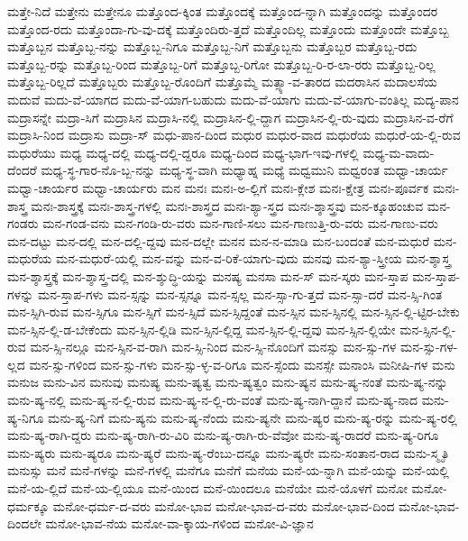 {ಮತ್ತೇ-ನಿದೆ
ಮತ್ತೇನು
ಮತ್ತೇನೂ
ಮತ್ತೊಂದ-ಕ್ಕಿಂತ
ಮತ್ತೊಂದಕ್ಕೆ
ಮತ್ತೊಂದ-ನ್ನಾಗಿ
ಮತ್ತೊಂದನ್ನು
ಮತ್ತೊಂದರ
ಮತ್ತೊಂದ-ರದು
ಮತ್ತೊಂದಾ-ಗು-ವು-ದಕ್ಕೆ
ಮತ್ತೊಂದಿರು-ತ್ತದೆ
ಮತ್ತೊಂದಿಲ್ಲ
ಮತ್ತೊಂದು
ಮತ್ತೊಂದೇ
ಮತ್ತೊಬ್ಬ
ಮತ್ತೊಬ್ಬನ
ಮತ್ತೊಬ್ಬ-ನನ್ನು
ಮತ್ತೊಬ್ಬ-ನಿಗೂ
ಮತ್ತೊಬ್ಬ-ನಿಗೆ
ಮತ್ತೊಬ್ಬನು
ಮತ್ತೊಬ್ಬರ
ಮತ್ತೊಬ್ಬ-ರದು
ಮತ್ತೊಬ್ಬ-ರನ್ನು
ಮತ್ತೊಬ್ಬ-ರಿಂದ
ಮತ್ತೊಬ್ಬ-ರಿಗೆ
ಮತ್ತೊಬ್ಬ-ರಿಗೋ
ಮತ್ತೊಬ್ಬ-ರಿ-ರ-ಲಾ-ರರು
ಮತ್ತೊಬ್ಬ-ರಿಲ್ಲ
ಮತ್ತೊಬ್ಬ-ರಿಲ್ಲದೆ
ಮತ್ತೊಬ್ಬರು
ಮತ್ತೊಬ್ಬ-ರೊಂದಿಗೆ
ಮತ್ತೊಮ್ಮೆ
ಮತ್ಸ್ಯಾ-ವ-ತಾರದ
ಮದರಾಸಿನ
ಮದಾಲಸೆಯ
ಮದುವೆ
ಮದು-ವೆ-ಯಾಗದ
ಮದು-ವೆ-ಯಾಗ-ಬಹುದು
ಮದು-ವೆ-ಯಾಗು
ಮದು-ವೆ-ಯಾಗು-ವಂತಿಲ್ಲ
ಮದ್ಯ-ಪಾನ
ಮದ್ರಾಸನ್ನೇ
ಮದ್ರಾ-ಸಿಗೆ
ಮದ್ರಾಸಿನ
ಮದ್ರಾಸಿ-ನಲ್ಲಿ
ಮದ್ರಾಸಿನ-ಲ್ಲಿ-ದ್ದಾಗ
ಮದ್ರಾಸಿನ-ಲ್ಲಿ-ರು-ವುದು
ಮದ್ರಾಸಿನ-ವ-ರೆಗೆ
ಮದ್ರಾಸಿ-ನಿಂದ
ಮದ್ರಾಸು
ಮದ್ರಾ-ಸ್
ಮಧು-ಪಾನ-ದಿಂದ
ಮಧುರ
ಮಧುರ-ವಾದ
ಮಧುರೆಯ
ಮಧುರೆ-ಯ-ಲ್ಲಿ-ರುವ
ಮಧುರೆಯು
ಮಧ್ಯ
ಮಧ್ಯ-ದಲ್ಲಿ
ಮಧ್ಯ-ದಲ್ಲಿ-ದ್ದರೂ
ಮಧ್ಯ-ದಿಂದ
ಮಧ್ಯ-ಭಾಗ-ಇವು-ಗಳಲ್ಲಿ
ಮಧ್ಯ-ಮ-ವಾದು-ದೆಂದರೆ
ಮಧ್ಯ-ಸ್ಥ-ಗಾರ-ನೊ-ಬ್ಬ-ನನ್ನು
ಮಧ್ಯ-ಸ್ಥ-ವಾಗಿ
ಮಧ್ಯಾಹ್ನ
ಮಧ್ಯೆ
ಮಧ್ವಮುನಿ
ಮಧ್ವರಂತ
ಮಧ್ವಾ-ಚಾರ್ಯ
ಮಧ್ವಾ-ಚಾರ್ಯರ
ಮಧ್ವಾ-ಚಾರ್ಯರು
ಮನ
ಮನಃ
ಮನಃ-ಅ-ಲ್ಲಿಗೆ
ಮನಃ-ಕ್ಲೇಶ
ಮನಃ-ಕ್ಷೇತ್ರ
ಮನಃ-ಪೂರ್ವಕ
ಮನಃ-ಶಾಸ್ತ್ರ
ಮನಃ-ಶಾಸ್ತ್ರಕ್ಕೆ
ಮನಃ-ಶಾಸ್ತ್ರ-ಗಳಲ್ಲಿ
ಮನಃ-ಶಾಸ್ತ್ರದ
ಮನಃ-ಶ್ಯಾ-ಸ್ತ್ರದ
ಮನಃ-ಶ್ಶಾಸ್ತ್ರವು
ಮನ-ಕ್ಕೂಹಂಚುವ
ಮನ-ಗಂಡರು
ಮನ-ಗಂಡ-ವನು
ಮನ-ಗಂಡಿ-ರು-ವರು
ಮನ-ಗಾಣಿ-ಸಲು
ಮನ-ಗಾಣುತ್ತಿ-ರು-ವರು
ಮನ-ಗಾಣು-ವರು
ಮನ-ದಟ್ಟು
ಮನ-ದಲ್ಲಿ
ಮನ-ದಲ್ಲಿ-ದ್ದವು
ಮನ-ದಲ್ಲೇ
ಮನನ
ಮನ-ನ-ಮಾಡಿ
ಮನ-ಬಂದಂತೆ
ಮನ-ಮಧುರೆ
ಮನ-ಮಧುರೆಯ
ಮನ-ಮಧುರೆ-ಯಲ್ಲಿ
ಮನ-ವನ್ನು
ಮನ-ವ-ರಿಕೆ-ಯಾಗು-ವುದು
ಮನವು
ಮನ-ಶ್ಯಾ-ಸ್ತ್ರೀಯ
ಮನ-ಶ್ಶಾಸ್ತ್ರ
ಮನ-ಶ್ಶಾಸ್ತ್ರಕ್ಕೆ
ಮನ-ಶ್ಶಾಸ್ತ್ರ-ದಲ್ಲಿ
ಮನ-ಶ್ಶುದ್ಧಿ-ಯನ್ನು
ಮನಷ್ಯ
ಮನಸಾ
ಮನ-ಸ್
ಮನ-ಸ್ಕರು
ಮನ-ಸ್ತಾಪ
ಮನ-ಸ್ತಾಪ-ಗಳನ್ನು
ಮನ-ಸ್ತಾಪ-ಗಳು
ಮನ-ಸ್ಸನ್ನು
ಮನ-ಸ್ಸನ್ನೂ
ಮನ-ಸ್ಸಲ್ಲ
ಮನ-ಸ್ಸಾ-ಗು-ತ್ತದೆ
ಮನ-ಸ್ಸಾ-ದರೆ
ಮನ-ಸ್ಸಿ-ಗಿಂತ
ಮನ-ಸ್ಸಿಗಿ-ರುವ
ಮನ-ಸ್ಸಿಗೂ
ಮನ-ಸ್ಸಿಗೆ
ಮನ-ಸ್ಸಿದೆ
ಮನ-ಸ್ಸಿದ್ದಂತೆ
ಮನ-ಸ್ಸಿನ
ಮನ-ಸ್ಸಿನಲ್ಲಿ
ಮನ-ಸ್ಸಿನ-ಲ್ಲಿ-ಟ್ಟಿರ-ಬೇಕು
ಮನ-ಸ್ಸಿನ-ಲ್ಲಿ-ಡ-ಬೇಕೆಂದು
ಮನ-ಸ್ಸಿನ-ಲ್ಲಿಡಿ
ಮನ-ಸ್ಸಿನ-ಲ್ಲಿದ್ದ
ಮನ-ಸ್ಸಿನ-ಲ್ಲಿ-ದ್ದವು
ಮನ-ಸ್ಸಿನ-ಲ್ಲಿಯೇ
ಮನ-ಸ್ಸಿನ-ಲ್ಲಿ-ರುವ
ಮನ-ಸ್ಸಿ-ನಲ್ಲೂ
ಮನ-ಸ್ಸಿನ-ವ-ರಾಗಿ
ಮನ-ಸ್ಸಿ-ನಿಂದ
ಮನ-ಸ್ಸಿ-ನೊಂದಿಗೆ
ಮನಸ್ಸು
ಮನ-ಸ್ಸು-ಗಳ
ಮನ-ಸ್ಸು-ಗಳ-ಲ್ಲದ
ಮನ-ಸ್ಸು-ಗಳಿಂದ
ಮನ-ಸ್ಸು-ಗಳು
ಮನ-ಸ್ಸು-ಳ್ಳ-ವ-ರಿಗೂ
ಮನ-ಸ್ಸೆಂದು
ಮನಸ್ಸೇ
ಮನಾಂಸಿ
ಮನೀಷಿ-ಗಳ
ಮನು
ಮನುಜ
ಮನು-ವಿನ
ಮನುವು
ಮನುಷ್ಯ
ಮನು-ಷ್ಯತ್ವ
ಮನು-ಷ್ಯತ್ವಂ
ಮನು-ಷ್ಯನ
ಮನು-ಷ್ಯ-ನಂತೆ
ಮನು-ಷ್ಯ-ನನ್ನು
ಮನು-ಷ್ಯ-ನಲ್ಲಿ
ಮನು-ಷ್ಯ-ನ-ಲ್ಲಿ-ರುವ
ಮನು-ಷ್ಯ-ನ-ಲ್ಲಿ-ರು-ವಂತೆ
ಮನು-ಷ್ಯ-ನಾಗಿ-ದ್ದಾನೆ
ಮನು-ಷ್ಯ-ನಾದ
ಮನು-ಷ್ಯ-ನಿಗೂ
ಮನು-ಷ್ಯ-ನಿಗೆ
ಮನು-ಷ್ಯನು
ಮನು-ಷ್ಯ-ನೆಂದು
ಮನು-ಷ್ಯನೇ
ಮನು-ಷ್ಯರ
ಮನು-ಷ್ಯ-ರನ್ನು
ಮನು-ಷ್ಯ-ರಲ್ಲಿ
ಮನು-ಷ್ಯ-ರಾಗಿ-ದ್ದರು
ಮನು-ಷ್ಯ-ರಾಗಿ-ರು-ವಿರಿ
ಮನು-ಷ್ಯ-ರಾಗಿ-ರು-ವೆವೋ
ಮನು-ಷ್ಯ-ರಾದರೆ
ಮನು-ಷ್ಯ-ರಿಗೂ
ಮನು-ಷ್ಯರು
ಮನು-ಷ್ಯರೂ
ಮನು-ಷ್ಯರೆ
ಮನು-ಷ್ಯ-ರೆಂಬು-ದನ್ನೂ
ಮನು-ಷ್ಯರೇ
ಮನು-ಸಂತಾನ-ರಾದ
ಮನು-ಸ್ಮೃತಿ
ಮನುಸ್ಸು
ಮನೆ
ಮನೆ-ಗಳನ್ನು
ಮನೆ-ಗಳಲ್ಲಿ
ಮನೆಗೂ
ಮನೆಗೆ
ಮನೆಯ
ಮನೆ-ಯ-ನ್ನಾಗಿ
ಮನೆ-ಯನ್ನು
ಮನೆ-ಯಲ್ಲಿ
ಮನೆ-ಯ-ಲ್ಲಿದೆ
ಮನೆ-ಯ-ಲ್ಲಿಯೂ
ಮನೆ-ಯಿಂದ
ಮನೆ-ಯಿಂದಲೂ
ಮನೆಯೇ
ಮನೆ-ಯೊಳಗೆ
ಮನೋ
ಮನೋ-ಧರ್ಮಕ್ಕೂ
ಮನೋ-ಧರ್ಮ-ದ-ವರು
ಮನೋ-ಭಾವ
ಮನೋ-ಭಾವ-ದ-ವರು
ಮನೋ-ಭಾವ-ದಿಂದ
ಮನೋ-ಭಾವ-ದಿಂದಲೇ
ಮನೋ-ಭಾವ-ನೆಯ
ಮನೋ-ವಾ-ಕ್ಕಾಯ-ಗಳಿಂದ
ಮನೋ-ವಿ-ಜ್ಞಾನ
}
